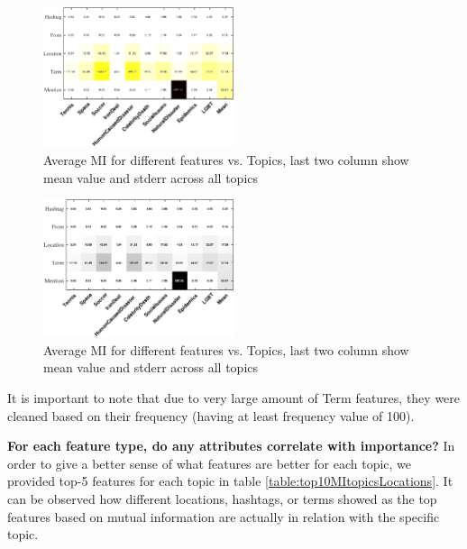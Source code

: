 \documentclass[letterpaper]{article}
\begin{document}
\begin{figure}[h!]
\centering
\includegraphics[width=0.5\textwidth]{images/avgMI2.pdf}
\vspace{-3mm}
\caption{Average MI for different features vs. Topics, last two column show mean value and stderr across all topics}
\label{fig:table1}
\end{figure}
\fi
\begin{figure}[h!]
\centering
\includegraphics[width=0.5\textwidth]{images/avgMI_gray.pdf}
\vspace{-3mm}
\caption{Average MI for different features vs. Topics, last two column show mean value and stderr across all topics}
\label{fig:table1}
\end{figure}

It is important to note that due to very large amount of Term features, they were cleaned based on their frequency (having at least frequency value of 100).

\textbf{For each feature type, do any attributes correlate with importance?} In order to give a better sense of what features are better for each topic, we provided top-5 features for each topic in table \ref{table:top10MItopicsLocations}. It can be observed how different locations, hashtags, or terms showed as the top features based on mutual information are actually in relation with the specific topic.%
\end{document}
